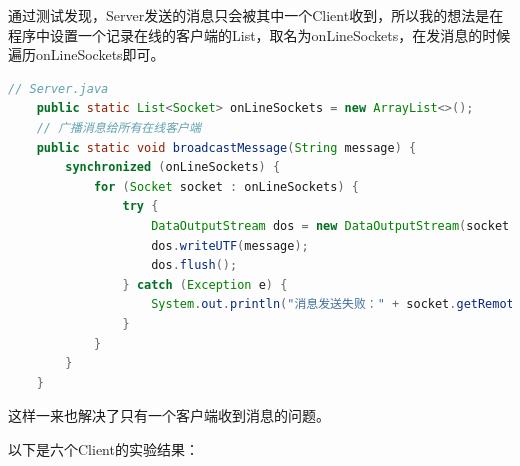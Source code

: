 \documentclass{article}
\begin{document}
	通过测试发现，Server发送的消息只会被其中一个Client收到，所以我的想法是在程序中设置一个记录在线的客户端的List，取名为onLineSockets，在发消息的时候遍历onLineSockets即可。
	
	\begin{lstlisting}[language=Java, title=完善-支持5个以上客户端同时发送消息并正确打印, tabsize=4]
	// Server.java
	public static List<Socket> onLineSockets = new ArrayList<>();
	// 广播消息给所有在线客户端
	public static void broadcastMessage(String message) {
		synchronized (onLineSockets) {
			for (Socket socket : onLineSockets) {
				try {
					DataOutputStream dos = new DataOutputStream(socket.getOutputStream());
					dos.writeUTF(message);
					dos.flush();
				} catch (Exception e) {
					System.out.println("消息发送失败：" + socket.getRemoteSocketAddress());
				}
			}
		}
	}
	\end{lstlisting}
	
	这样一来也解决了只有一个客户端收到消息的问题。
	
	以下是六个Client的实验结果：
	
\end{document}
